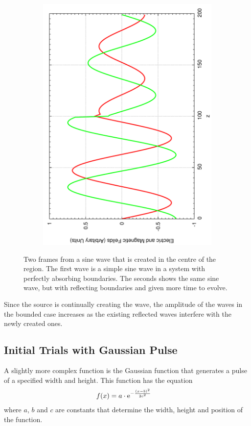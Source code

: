 \begin{figure}[ht]
\begin{subfigure}[ht]{0.45\textwidth}
                \includegraphics[angle=270, width=\textwidth]{boundsine.pdf}
        \end{subfigure}
        \caption{Two frames from a sine wave that is created in the centre of the region. The first wave is a simple sine wave in a system with perfectly absorbing boundaries. The seconds shows the same sine wave, but with reflecting boundaries and given more time to evolve.}\label{fig:initialsines}
\end{figure}

Since the source is continually creating the wave, the amplitude of the waves in the bounded case increases as the existing reflected waves interfere with the newly created ones. 

\subsection{Initial Trials with Gaussian Pulse} %
\label{sub:initial_trials_with_gaussian_pulse}
A slightly more complex function is the Gaussian function that generates a pulse of a specified width and height. This function has the equation
\begin{align}
        f(x) &= a\cdot\text{e}^{-\frac{(x-b)^2}{2c^2}} \label{eq:gaussian}
\end{align}
where $a$, $b$ and $c$ are constants that determine the width, height and position of the function.

